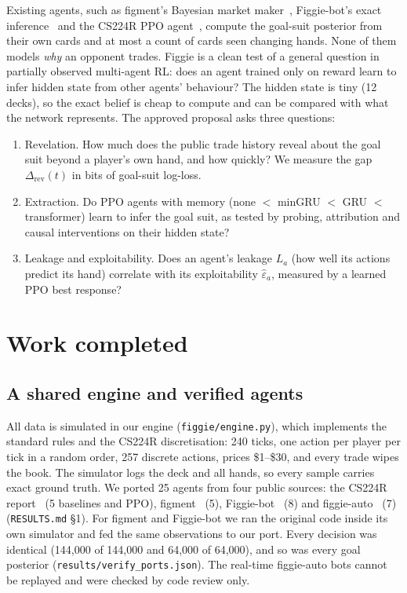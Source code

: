 \documentclass{article}
\newcommand{\file}[1]{{\small\texttt{#1}}}
\begin{document}
Existing agents, such as figment's Bayesian market maker~\cite{figment}, Figgie-bot's exact inference~\cite{figgiebot} and the CS224R PPO agent~\cite{cs224r}, compute the goal-suit posterior from their own cards and at most a count of cards seen changing hands. None of them models \emph{why} an opponent trades.
Figgie is a clean test of a general question in partially observed multi-agent RL: does an agent trained only on reward learn to infer hidden state from other agents' behaviour?
The hidden state is tiny (12 decks), so the exact belief is cheap to compute and can be compared with what the network represents.
The approved proposal asks three questions:
\begin{enumerate}[label=Q\arabic*.]
  \item Revelation. How much does the public trade history reveal about the goal suit beyond a player's own hand, and how quickly? We measure the gap $\Delta_{\text{rev}}(t)$ in bits of goal-suit log-loss.
  \item Extraction. Do PPO agents with memory (none $<$ minGRU $<$ GRU $<$ transformer) learn to infer the goal suit, as tested by probing, attribution and causal interventions on their hidden state?
  \item Leakage and exploitability. Does an agent's leakage $L_a$ (how well its actions predict its hand) correlate with its exploitability $\hat\varepsilon_a$, measured by a learned PPO best response?
\end{enumerate}

\section{Work completed}

\subsection{A shared engine and verified agents}
All data is simulated in our engine (\file{figgie/engine.py}), which implements the standard rules and the CS224R discretisation: 240 ticks, one action per player per tick in a random order, 257 discrete actions, prices \$1--\$30, and every trade wipes the book.
The simulator logs the deck and all hands, so every sample carries exact ground truth.
We ported 25 agents from four public sources: the CS224R report~\cite{cs224r} (5 baselines and PPO), figment~\cite{figment} (5), Figgie-bot~\cite{figgiebot} (8) and figgie-auto~\cite{figgieauto} (7) (\file{RESULTS.md} \S1).
For figment and Figgie-bot we ran the original code inside its own simulator and fed the same observations to our port. Every decision was identical (144{,}000 of 144{,}000 and 64{,}000 of 64{,}000), and so was every goal posterior (\file{results/verify\_ports.json}).
The real-time figgie-auto bots cannot be replayed and were checked by code review only.
\end{document}
